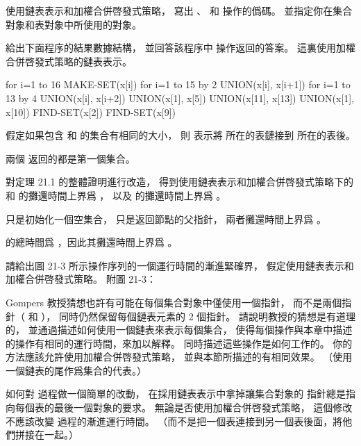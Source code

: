 \startsection[
  title={Linked-list representation of disjoint sets},
]

\startEXERCISE
使用鏈表表示和加權合併啓發式策略，
寫出 、  和  操作的僞碼。
並指定你在集合對象和表對象中所使用的對象。
\stopEXERCISE

\startANSWER
{}
\stopANSWER

\startEXERCISE[exercise:21.2-2]
給出下面程序的結果數據結構，
並回答該程序中  操作返回的答案。
這裏使用加權合併啓發式策略的鏈表表示。

\startCLRS
for i=1 to 16
	MAKE-SET(x[i])
for i=1 to 15 by 2
	UNION(x[i], x[i+1])
for i=1 to 13 by 4
	UNION(x[i], x[i+2])
UNION(x[1], x[5])
UNION(x[11], x[13])
UNION(x[1], x[10])
FIND-SET(x[2])
FIND-SET(x[9])
\stopCLRS

假定如果包含  和  的集合有相同的大小，
則  表示將  所在的表鏈接到  所在的表後。
\stopEXERCISE

\startANSWER
兩個  返回的都是第一個集合。
\stopANSWER

\startEXERCISE
對定理 21.1 的整體證明進行改造，
得到使用鏈表表示和加權合併啓發式策略下的  和  的攤還時間上界爲 ，
以及  的攤還時間上界爲 。
\stopEXERCISE

\startANSWER
{} 只是初始化一個空集合，  只是返回節點的父指針，
兩者攤還時間上界爲 。

 的總時間爲 ，因此其攤還時間上界爲 。
\stopANSWER

\startEXERCISE
請給出圖 21-3 所示操作序列的一個運行時間的漸進緊確界，
假定使用鏈表表示和加權合併啓發式策略。
附圖 21-3：

\stopEXERCISE

\startANSWER
{}
\stopANSWER

\startEXERCISE
Gompers 教授猜想也許有可能在每個集合對象中僅使用一個指針，
而不是兩個指針（ 和 ），
同時仍然保留每個鏈表元素的 2 個指針。
請說明教授的猜想是有道理的，
並通過描述如何使用一個鏈表來表示每個集合，
使得每個操作與本章中描述的操作有相同的運行時間，來加以解釋。
同時描述這些操作是如何工作的。
你的方法應該允許使用加權合併啓發式策略，
並與本節所描述的有相同效果。
（\hint 使用一個鏈表的尾作爲集合的代表。）
\stopEXERCISE

\startANSWER
{}
\stopANSWER

\startEXERCISE
如何對  過程做一個簡單的改動，
在採用鏈表表示中拿掉讓集合對象的  指針總是指向每個表的最後一個對象的要求。
無論是否使用加權合併啓發式策略，
這個修改不應該改變  過程的漸進運行時間。
（\hint 而不是把一個表連接到另一個表後面，將他們拼接在一起。）
\stopEXERCISE

\startANSWER
{}
\stopANSWER

\stopsection
